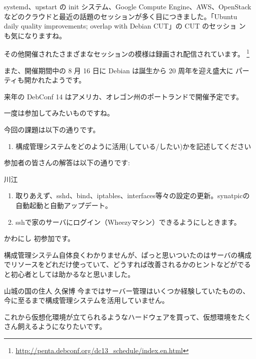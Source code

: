 \documentclass[mingoth,a4paper]{jsarticle}
\begin{document}
systemd、upstart の init システム、Google Compute Engine、AWS、OpenStack
などのクラウドと最近の話題のセッションが多く目につきました。「Ubuntu
daily quality improvements; overlap with Debian CUT」の CUT のセッショ
ンも気になりますね。

その他開催されたさまざまなセッションの模様は録画され配信されています。
\footnote{\url{http://penta.debconf.org/dc13_schedule/index.en.html}}

また、開催期間中の 8 月 16 日に Debian は誕生から 20 周年を迎え盛大に
パーティも開かれたようです。

来年の DebConf 14 はアメリカ、オレゴン州のポートランドで開催予定です。

一度は参加してみたいものですね。


今回の課題は以下の通りです。
\begin{screen}
  \begin{enumerate}
  \item %
    構成管理システムをどのように活用(している/したい)かを記述してください
  \end{enumerate}
\end{screen}

参加者の皆さんの解答は以下の通りです:

\begin{prework}{ 川江 }
  \begin{enumerate}
  \item 取りあえず、sshd、bind、iptables、interfaces等々の設定の更新。synatpicの自動起動と自動アップデート。
  \item sshで家のサーバにログイン（Wheezyマシン）できるようにしときます。
  \end{enumerate}
\end{prework}

\begin{prework}{ かわにし }
  初参加です。

  構成管理システム自体良くわかりませんが、ぱっと思いついたのはサーバの構成でリソースをどれだけ使っていて、どうすれば改善されるかのヒントなどがでると初心者としては助かるなと思いました。
\end{prework}

\begin{prework}{ 山城の国の住人 久保博 }
  今まではサーバー管理はいくつか経験していたものの、今に至るまで構成管理システムを活用していません。

  これから仮想化環境が立てられるようなハードウェアを買って、仮想環境をたくさん飼えるようになりたいです。
\end{prework}
\end{document}
